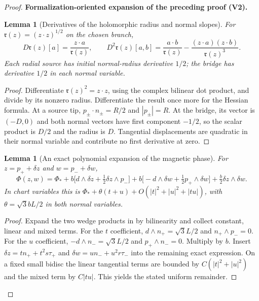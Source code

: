 \documentclass[11pt]{article}
\newtheorem{lemma}[theorem]{Lemma}
\newcommand{\formalisationparentid}{X}
\newenvironment{formalisationaddition}[1]{\par\medskip\begingroup\color{blue}\def\formalisationparentid{#1}\setcounter{formalizationsublemma}{0}\let\lemma\formalizationsublemma\let\endlemma\endformalizationsublemma
  \def\Eo{\mathcal E_h^\circ}\def\EE{\mathcal E_h}\def\phio{\phi_h^\circ}\def\phih{\phi_h}\def\Ho{H_h^{\rm atom}(v^\circ)}\def\Ha{H_h^{\rm atom}}\def\HL{H_h^{L}}\def\Dh{D_h}\def\Log{\operatorname{Log}}\def\ellh{\ell_h}\def\Gp{G_{p,h}}\def\Ast{A_{*,h}}\def\ahat{\widehat{\mathfrak a}_h}\def\ah{\mathfrak a_h}\def\rh{\widehat\rho_h}\def\deltah{\widehat\delta_h}\def\oldref##1{\textup{(##1)}}\def\interface##1{\par\noindent\textit{Analytical interface used here.} ##1\par}\def\finish{\par\noindent\textit{Conclusion of the formalization-oriented expansion.} }\par\noindent\textbf{Formalization-oriented expansion of the preceding proof (V2).}\par\smallskip
}{\par\endgroup\medskip
}
\begin{document}
\begin{proof}
\begin{formalisationaddition}{P6.7}
\begin{lemma}[Derivatives of the holomorphic radius and normal slopes]\label{sublemma:P6-7-radius-derivatives}
For $\mathfrak r(z)=(z\cdot z)^{1/2}$ on the chosen branch,
\[
 D\mathfrak r(z)[a]=\frac{z\cdot a}{\mathfrak r(z)},\qquad
 D^2\mathfrak r(z)[a,b]=\frac{a\cdot b}{\mathfrak r(z)}
       -\frac{(z\cdot a)(z\cdot b)}{\mathfrak r(z)^3}.
\]
Each radial source has initial normal-radius derivative $1/2$;
the bridge has derivative $1/2$ in each normal variable.
\end{lemma}
\begin{proof}
Differentiate $\mathfrak r(z)^2=z\cdot z$, using the complex bilinear
dot product, and divide by its nonzero radius. Differentiate the
result once more for the Hessian formula.
At a source tip, $p_\pm\cdot n_\pm=R/2$ and $|p_\pm|=R$.
At the bridge, its vector is $(-D,0)$ and both normal vectors have
first component $-1/2$, so the scalar product is $D/2$ and the radius
is $D$. Tangential displacements are quadratic in their normal
variable and contribute no first derivative at zero.
\end{proof}

\begin{lemma}[An exact polynomial expansion of the magnetic phase]\label{sublemma:P6-7-magnetic-polynomial}
For $z=p_++\delta z$ and $w=p_-+\delta w$,
\[
 \Phi(z,w)=\Phi_*+
 b\bigl[d\wedge\delta z+\tfrac12\delta z\wedge p_-\bigr]
 +b\bigl[-d\wedge\delta w+\tfrac12p_+\wedge\delta w\bigr]
 +\tfrac b2\delta z\wedge\delta w.
\]
In chart variables this is
$\Phi_*+\theta(t+u)+O(|t|^2+|u|^2+|tu|)$,
with $\theta=\sqrt3bL/2$ in both normal variables.
\end{lemma}
\begin{proof}
Expand the two wedge products in  by bilinearity and
collect constant, linear and mixed terms. For the $t$ coefficient,
$d\wedge n_+=\sqrt3 L/2$ and $n_+\wedge p_-=0$.
For the $u$ coefficient, $-d\wedge n_-=\sqrt3 L/2$ and
$p_+\wedge n_-=0$. Multiply by $b$.
Insert $\delta z=tn_++t^2s\tau_+$ and
$\delta w=un_-+u^2r\tau_-$ into the remaining exact expression.
On a fixed small bidisc the linear tangential terms are bounded by
$C(|t|^2+|u|^2)$ and the mixed term by $C|tu|$.
This yields the stated uniform remainder.
\end{proof}


\end{formalisationaddition}
\end{proof}
\end{document}
